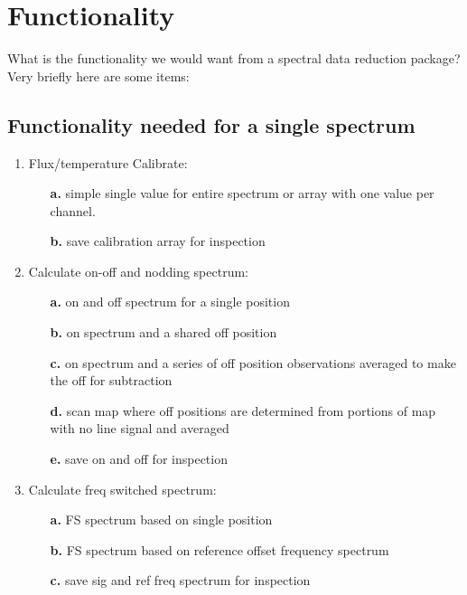 \documentclass[12pt,a4paper]{article}
\begin{document}
\section{Functionality}

What is the functionality we would want from a spectral data reduction
package? Very briefly here are some items:

\subsection{Functionality needed for a single spectrum}

\begin{enumerate}

\item Flux/temperature Calibrate: 
  \begin{itemize}
    \item[{\bf a.}]
    simple single value for entire spectrum or array with one 
       value per channel.
    \item[{\bf b.}]
   save calibration array for inspection
    
  \end{itemize}

\item Calculate on-off and nodding spectrum:
  \begin{itemize}
  \item[{\bf a.}]
    on and off spectrum for a single position
  \item[{\bf b.}]   
    on spectrum and a shared off position
  \item[{\bf c.}]   
    on spectrum and a series of off position observations
    averaged to make the off for subtraction
  \item[{\bf d.}]   
    scan map where off positions are determined from
    portions of map with no line signal and averaged
  \item[{\bf e.}]   
    save on and off for inspection
  \end{itemize}

\item   Calculate freq switched spectrum:
  \begin{itemize}
  \item[{\bf a.}]   
    FS spectrum based on single position
  \item[{\bf b.}]   
    FS spectrum based on reference offset frequency spectrum
  \item[{\bf c.}]   
    save sig and ref freq spectrum for inspection
  \end{itemize}


\end{enumerate}
\end{document}

